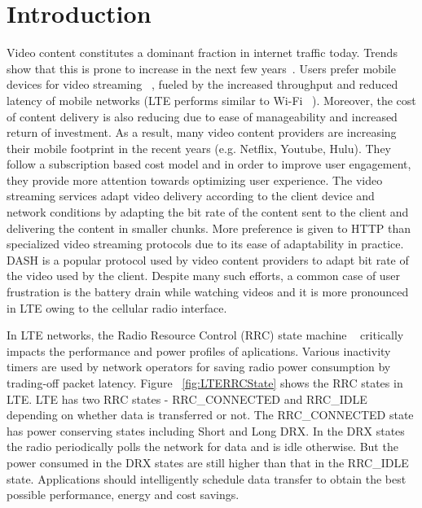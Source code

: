\section{Introduction}
Video content constitutes a dominant fraction in internet traffic today. Trends show that this is prone to increase in the next few years~\cite{}.
Users prefer mobile devices for video streaming ~\cite{}, fueled by the increased throughput and reduced latency of mobile networks (LTE performs similar to Wi-Fi ~\cite{LTEPaper}).
Moreover, the cost of content delivery is also reducing due to ease of manageability and increased return of investment. As a result, many video content providers are increasing their mobile footprint in the recent years (e.g. Netflix, Youtube, Hulu). 
They follow a subscription based cost model and in order to improve user engagement, they provide more attention towards optimizing user experience. The video streaming services adapt video delivery according to the client device and network conditions by adapting the bit rate of the content sent to the client and delivering the content in smaller chunks. 
More preference is given to HTTP than specialized video streaming protocols due to its ease of adaptability in practice.  
DASH is a popular protocol used by video content providers to adapt bit rate of the video used by the client. Despite many such efforts, a common case of user frustration is the battery drain while watching videos and it is more pronounced in LTE owing to the cellular radio interface. 
 
In LTE networks, the Radio Resource Control (RRC) state machine ~\cite{LTEPaper} critically impacts the performance and power profiles of aplications. Various inactivity timers are used by network operators for saving radio power consumption by trading-off packet latency. Figure ~\ref{fig:LTERRCState} shows the RRC states in LTE. LTE has two RRC states - RRC\_CONNECTED and RRC\_IDLE depending on whether data is transferred or not. The RRC\_CONNECTED state has power conserving states including Short and Long DRX. In the DRX states the radio periodically polls the network for data and is idle otherwise. But the power consumed in the DRX states are still higher than that in the RRC\_IDLE state.
Applications should intelligently schedule data transfer to obtain the best possible performance, energy and cost savings. 

